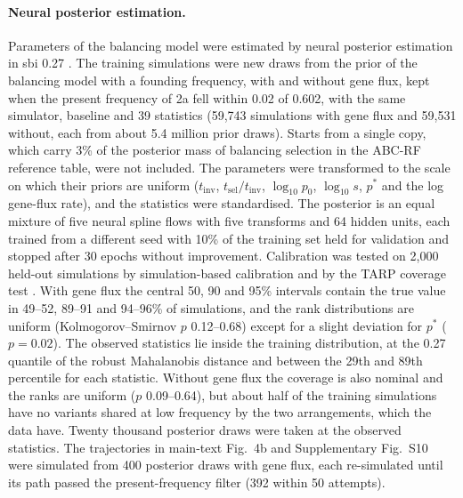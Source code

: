 \documentclass[11pt]{article}
\begin{document}
\paragraph{Neural posterior estimation.}
Parameters of the balancing model were estimated by neural posterior estimation \citep{cranmer2020,min2026} in sbi 0.27 \citep{tejero2020,boelts2025}. The training simulations were new draws from the prior of the balancing model with a founding frequency, with and without gene flux, kept when the present frequency of 2a fell within 0.02 of 0.602, with the same simulator, baseline and 39 statistics (59{,}743 simulations with gene flux and 59{,}531 without, each from about 5.4 million prior draws). Starts from a single copy, which carry 3\% of the posterior mass of balancing selection in the ABC-RF reference table, were not included. The parameters were transformed to the scale on which their priors are uniform ($t_\mathrm{inv}$, $t_\mathrm{sel}/t_\mathrm{inv}$, $\log_{10}p_0$, $\log_{10}s$, $p^{*}$ and the log gene-flux rate), and the statistics were standardised. The posterior is an equal mixture of five neural spline flows \citep{durkan2019} with five transforms and 64 hidden units, each trained from a different seed with 10\% of the training set held for validation and stopped after 30 epochs without improvement. Calibration was tested on 2{,}000 held-out simulations by simulation-based calibration \citep{talts2018} and by the TARP coverage test \citep{lemos2023}. With gene flux the central 50, 90 and 95\% intervals contain the true value in 49--52, 89--91 and 94--96\% of simulations, and the rank distributions are uniform (Kolmogorov--Smirnov $p$ 0.12--0.68) except for a slight deviation for $p^{*}$ ($p=0.02$). The observed statistics lie inside the training distribution, at the 0.27 quantile of the robust Mahalanobis distance and between the 29th and 89th percentile for each statistic. Without gene flux the coverage is also nominal and the ranks are uniform ($p$ 0.09--0.64), but about half of the training simulations have no variants shared at low frequency by the two arrangements, which the data have. Twenty thousand posterior draws were taken at the observed statistics. The trajectories in main-text Fig.~4b and Supplementary Fig.~S10 were simulated from 400 posterior draws with gene flux, each re-simulated until its path passed the present-frequency filter (392 within 50 attempts).
\end{document}

